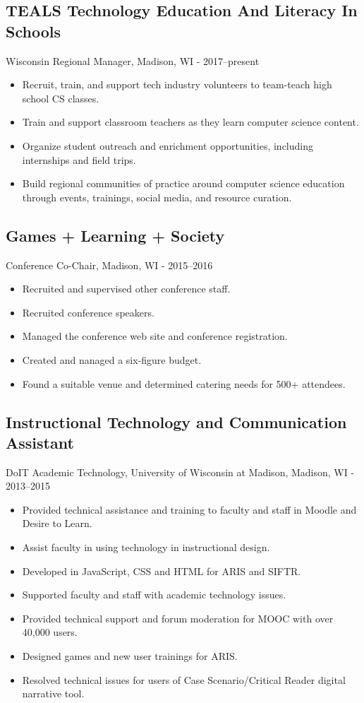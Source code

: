 \documentclass[../main.tex]{subfiles}
\begin{document}
\subsection*{TEALS Technology Education And Literacy In Schools}
     Wisconsin Regional Manager, Madison, WI - 2017--present
	\begin{itemize}
		\item{Recruit, train, and support tech industry volunteers to team-teach high school CS classes.}
		\item{Train and support classroom teachers as they learn computer science content.}
		\item{Organize student outreach and enrichment opportunities, including internships and field trips.}
		\item{Build regional communities of practice around computer science education through events, trainings, social media, and resource curation.}
	\end{itemize}

\subsection*{Games + Learning + Society }
     Conference Co-Chair, Madison, WI - 2015--2016
	\begin{itemize}
		\item{Recruited and supervised other conference staff.}
		\item{Recruited conference speakers.}
		\item{Managed the conference web site and conference registration.}
		\item{Created and nanaged a six-figure budget.}
		\item{Found a suitable venue and determined catering needs for 500+ attendees.}
	\end{itemize}

\subsection*{Instructional Technology and Communication Assistant}
     DoIT Academic Technology, University of Wisconsin at Madison, Madison, WI - 2013--2015
	\begin{itemize}
		\item{Provided technical assistance and training to faculty and staff in Moodle and Desire to Learn.}
		\item{Assist faculty in using technology in instructional design.}
		\item{Developed in JavaScript, CSS and HTML for ARIS and SIFTR.}
		\item{Supported faculty and staff with academic technology issues.}
		\item{Provided technical support and forum moderation for MOOC with over 40,000 users.}
		\item{Designed games and new user trainings for ARIS.}
		\item{Resolved technical issues for users of Case Scenario/Critical Reader digital narrative tool.}
	\end{itemize}
\end{document}
